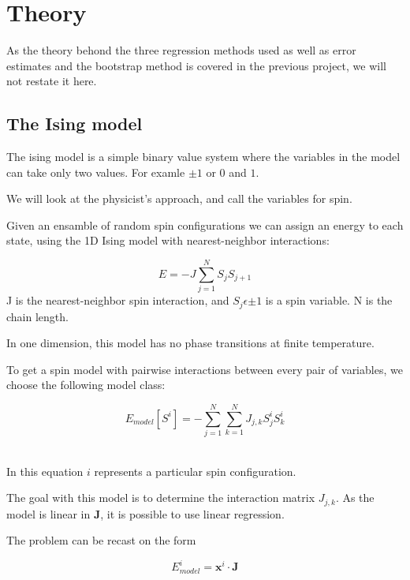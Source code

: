 \section{Theory}


As the theory behond the three regression methods used as well as error 
estimates and the bootstrap method is covered in the previous 
project, we will not restate it here.

\subsection{The Ising model} 
The ising model is a simple binary value system where the variables
in the model can take only two values. For examle \(\pm 1\) or \(0\) and \(1\). 
~\cite{Project2} 

We will look at the physicist's approach, and call the variables for spin.
~\cite{Project2}

Given an ensamble of random spin configurations we can assign an energy to
each state, using the 1D Ising model with nearest-neighbor interactions: 

\begin{equation}
	E = -J\sum\limits_{j=1}^N S_jS_{j+1} 
\end{equation}
J is the nearest-neighbor spin interaction, and \(S_j \epsilon {\pm 1}\) is a 
spin variable. N is the chain length. 
~\cite{HighBias}~\cite{Project2} 

In one dimension, this model has no phase transitions at finite temperature.
~\cite{Project2} 

To get a spin model with pairwise interactions between every pair of variables,
we choose the following model class: 

\begin{equation}
	E_{model}[S^i] = -\sum\limits_{j=1}^N\sum\limits_{k=1}^N J_{j,k} S_j^iS_{k}^i
\end{equation}
~\cite{HighBias} 

In this equation \(i\) represents a particular spin configuration. ~\cite{Project2}

The goal with this model is to determine the interaction matrix \(J_{j,k}\). 
As the model is linear in \(\mathbf{J}\), it is possible to use
linear regression.  

The problem can be recast on the form

\begin{equation}
	E_{model}^i = \mathbf{x}^i \cdot \mathbf{J}  
\end{equation}

